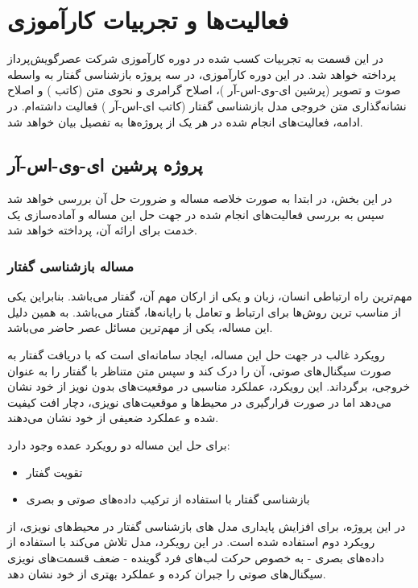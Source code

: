 \chapter{فعالیت‌ها و تجربیات کارآموزی}

در این قسمت به تجربیات کسب شده در دوره کارآموزی شرکت عصر‌گویش‌پرداز پرداخته خواهد شد. در این دوره کارآموزی، در سه پروژه بازشناسی گفتار به واسطه صوت و تصویر (پرشین ای-وی-اس-آر
)، اصلاح گرامری و نحوی متن (کاتب 
) و اصلاح نشانه‌گذاری متن
خروجی مدل بازشناسی گفتار (کاتب ای-اس-آر
) فعالیت داشته‌ام. در ادامه، فعالیت‌های انجام شده در هر یک از پروژه‌ها به تفصیل بیان خواهد شد.

\section{پروژه پرشین ای-وی-اس-آر}

در این بخش، در ابتدا به صورت خلاصه مساله و ضرورت حل آن بررسی خواهد شد سپس به بررسی فعالیت‌های انجام شده در جهت حل این مساله و آماده‌سازی یک خدمت
برای ارائه آن، پرداخته خواهد شد.

\subsection{مساله بازشناسی گفتار}

مهم‌ترین راه ارتباطی انسان، زبان و یکی از ارکان مهم آن، گفتار می‌باشد. بنابراین یکی از مناسب ترین روش‌ها برای ارتباط و تعامل با رایانه‌ها، گفتار می‌باشد. به همین دلیل این مساله، یکی از مهم‌ترین مسائل عصر حاضر می‌باشد. 

رویکرد غالب در جهت حل این مساله، ایجاد سامانه‌ای است که با دریافت گفتار به صورت سیگنال‌های صوتی، آن را درک کند و سپس متن متناظر با گفتار را به عنوان خروجی، برگرداند. این رویکرد، عملکرد مناسبی در موقعیت‌های بدون نویز از خود نشان می‌دهد اما در صورت قرارگیری در محیط‌ها و موقعیت‌های نویزی، دچار افت کیفیت شده و عملکرد ضعیفی از خود نشان می‌دهند.

برای حل این مساله دو رویکرد عمده وجود دارد:
\begin{itemize}
	\item تقویت گفتار
	\item بازشناسی گفتار با استفاده از ترکیب داده‌های صوتی و بصری
\end{itemize}

در این پروژه، برای افزایش پایداری
مدل های بازشناسی گفتار در محیط‌های نویزی، از رویکرد دوم استفاده شده است. در این رویکرد، مدل تلاش می‌کند با استفاده از داده‌های بصری - به خصوص حرکت لب‌های فرد گوینده - ضعف قسمت‌های نویزی سیگنال‌های صوتی را جبران کرده و عملکرد بهتری از خود نشان دهد.

